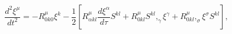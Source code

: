 \begin{equation}
\frac{d^{2}\xi ^{\mu }}{dt^{2}}=-R_{0k0}^{\mu }\xi ^{k}-\frac{1}{2}[%
R_{\alpha kl}^{\mu }\frac{d\xi ^{\alpha }}{d\tau }S^{kl}+R_{0kl}^{\mu
}S^{kl},_{\gamma }\xi ^{\gamma }+R_{0kl}^{\mu },_{\sigma }\xi ^{\sigma
}S^{kl}],  \label{39}
\end{equation}

